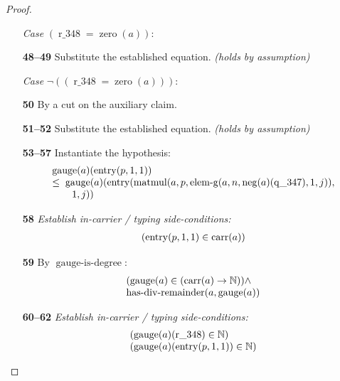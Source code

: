 \documentclass[11pt]{article}
\theoremstyle{plain}
\begin{document}
\begin{proof}
\begin{itemize}[leftmargin=2.8em, itemsep=4pt, parsep=1pt]
  \item[]\emph{Case} $(\operatorname{r\_348} = \operatorname{zero}(a))$:
  \item[\textbf{48--49}] Substitute the established equation.  \emph{(holds by assumption)}
  \item[]\emph{Case} $\lnot((\operatorname{r\_348} = \operatorname{zero}(a)))$:
  \item[\textbf{50}] By a cut on the auxiliary claim.
  \item[\textbf{51--52}] Substitute the established equation.  \emph{(holds by assumption)}
  \item[\textbf{53--57}] Instantiate the hypothesis:
\begin{equation*}
\begin{array}{@{}l@{}} \operatorname{gauge}(a)(\operatorname{entry}(p, 1, 1)) \\ \leq\; \operatorname{gauge}(a)(\operatorname{entry}(\operatorname{matmul}(a, p, \operatorname{elem\text{-}g}(a, n, \operatorname{neg}(a)(\operatorname{q\_347}), 1, j)), \\ \quad \quad 1, j)) \end{array}
\end{equation*}

  \item[\textbf{58}] \emph{Establish in-carrier / typing side-conditions:}
\begin{equation*}
\begin{array}{@{}l@{}}
(\operatorname{entry}(p, 1, 1) \in \operatorname{carr}(a))
\end{array}
\end{equation*}

  \item[\textbf{59}] By $\operatorname{gauge\text{-}is\text{-}degree}$:
\begin{equation*}
\begin{array}{@{}l@{}} (\operatorname{gauge}(a) \in (\operatorname{carr}(a) \to \mathbb{N})) \wedge \\ \operatorname{has\text{-}div\text{-}remainder}(a, \operatorname{gauge}(a)) \end{array}
\end{equation*}

  \item[\textbf{60--62}] \emph{Establish in-carrier / typing side-conditions:}
\begin{equation*}
\begin{array}{@{}l@{}}
(\operatorname{gauge}(a)(\operatorname{r\_348}) \in \mathbb{N}) \\
(\operatorname{gauge}(a)(\operatorname{entry}(p, 1, 1)) \in \mathbb{N})
\end{array}
\end{equation*}


\end{itemize}
\end{proof}
\end{document}
